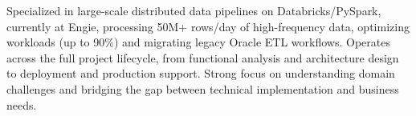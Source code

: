 \documentclass[]{plushcv}
\begin{document}

%
%

\small {
}


\vspace{16pt}

Specialized in large-scale distributed data pipelines on Databricks/PySpark, currently at Engie, processing 50M+ rows/day of high-frequency data, optimizing workloads (up to 90\%) and migrating legacy Oracle ETL workflows. Operates across the full project lifecycle, from functional analysis and architecture design to deployment and production support. Strong focus on understanding domain challenges and bridging the gap between technical implementation and business needs.

\vspace{-6pt}


%
%
\end{document}
